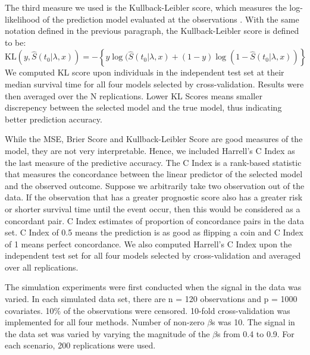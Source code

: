 \par The third measure we used is the Kullback-Leibler score, which measures the log-likelihood of the prediction model evaluated at the observations \citep{VanHouwelingen2011}. With the same notation defined in the previous paragraph, the Kullback-Leibler score is defined to be:
\begin{equation}
	\text{KL}(y, \hat{S}(t_0|\lambda,x)) = -\left\{ y\log(\hat{S}(t_0|\lambda,x) + (1 - y)\log(1 - \hat{S}(t_0|\lambda,x)) \right\}
\end{equation}
We computed KL score upon individuals in the independent test set at their median survival time for all four models selected by cross-validation. Results were then averaged over the N replications. Lower KL Scores means smaller discrepency between the selected model and the true model, thus indicating better prediction accuracy.

\par While the MSE, Brier Score and Kullback-Leibler Score are good measures of the model, they are not very interpretable. Hence, we included Harrell's C Index as the last measure of the predictive accuracy\citep{HarrellJr1984}. The C Index is a rank-based statistic that measures the concordance between the linear predictor of the selected model and the observed outcome. Suppose we arbitrarily take two observation out of the data. If the observation that has a greater prognostic score also has a greater risk or shorter survival time until the event occur, then this would be considered as a concordant pair. C Index estimates of proportion of concordance pairs in the data set. C Index of 0.5 means the prediction is as good as flipping a coin and C Index of 1 means perfect concordance. We also computed Harrell's C Index upon the independent test set for all four models selected by cross-validation and averaged over all replications.

The simulation experiments were first conducted when the signal in the data was varied. In each simulated data set, there are n = 120 observations and p = 1000 covariates. 10$\%$ of the observations were censored. 10-fold cross-validation was implemented for all four methods. Number of non-zero $\beta$s was 10. The signal in the data set was varied by varying the magnitude of the $\beta$s from 0.4 to 0.9. For each scenario, 200 replications were used. 
   
